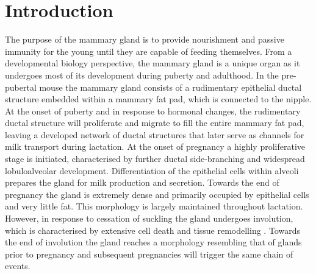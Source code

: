 \documentclass[titlepage, 12pt, oneside]{amsart}
\begin{document}
\section{Introduction}
The purpose of the mammary gland is to provide nourishment and passive immunity for the young until they are capable of feeding themselves.
From a developmental biology perspective, the mammary gland is a unique organ as it undergoes most of its development during puberty and adulthood\autocite{Watson2008,Hennighausen2005,Hennighausen1998,Inman2015}.
In the pre-pubertal mouse the mammary gland consists of a rudimentary epithelial ductal structure embedded within a mammary fat pad, which is connected to the nipple\autocite{Mikkola2006,Hens2005}.
At the onset of puberty and in response to hormonal changes, the rudimentary ductal structure will proliferate and migrate to fill the entire mammary fat pad, leaving a developed network of ductal structures that later serve as channels for milk transport during lactation.
At the onset of pregnancy a highly proliferative stage is initiated, characterised by further ductal side-branching and widespread lobuloalveolar development\autocite{Watson2008}.
Differentiation of the epithelial cells within alveoli prepares the gland for milk production and secretion.
Towards the end of pregnancy the gland is extremely dense and primarily occupied by epithelial cells and very little fat.
This morphology is largely maintained throughout lactation.
However, in response to cessation of suckling the gland undergoes involution, which is characterised by extensive cell death and tissue remodelling \autocite{Inman2015,Watson2006}.
Towards the end of involution the gland reaches a morphology resembling that of glands prior to pregnancy and subsequent pregnancies will trigger the same chain of events.
\end{document}
